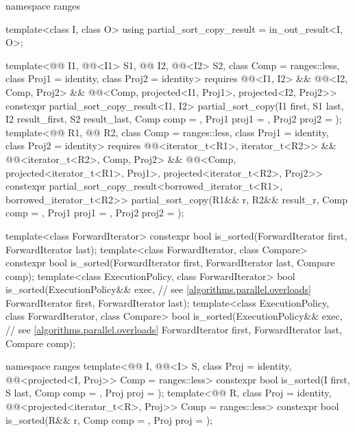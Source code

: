 \begin{codeblock}
{  namespace ranges {
    template<class I, class O>
      using partial_sort_copy_result = in_out_result<I, O>;

    template<@@ I1, @@<I1> S1,
             @@ I2, @@<I2> S2,
             class Comp = ranges::less, class Proj1 = identity, class Proj2 = identity>
      requires @@<I1, I2> && @@<I2, Comp, Proj2> &&
               @@<Comp, projected<I1, Proj1>, projected<I2, Proj2>>
      constexpr partial_sort_copy_result<I1, I2>
        partial_sort_copy(I1 first, S1 last, I2 result_first, S2 result_last,
                          Comp comp = {}, Proj1 proj1 = {}, Proj2 proj2 = {});
    template<@@ R1, @@ R2, class Comp = ranges::less,
             class Proj1 = identity, class Proj2 = identity>
      requires @@<iterator_t<R1>, iterator_t<R2>> &&
               @@<iterator_t<R2>, Comp, Proj2> &&
               @@<Comp, projected<iterator_t<R1>, Proj1>,
                                          projected<iterator_t<R2>, Proj2>>
      constexpr partial_sort_copy_result<borrowed_iterator_t<R1>, borrowed_iterator_t<R2>>
        partial_sort_copy(R1&& r, R2&& result_r, Comp comp = {},
                          Proj1 proj1 = {}, Proj2 proj2 = {});
  }

  template<class ForwardIterator>
    constexpr bool is_sorted(ForwardIterator first, ForwardIterator last);
  template<class ForwardIterator, class Compare>
    constexpr bool is_sorted(ForwardIterator first, ForwardIterator last,
                             Compare comp);
  template<class ExecutionPolicy, class ForwardIterator>
    bool is_sorted(ExecutionPolicy&& exec,                      // see \ref{algorithms.parallel.overloads}
                   ForwardIterator first, ForwardIterator last);
  template<class ExecutionPolicy, class ForwardIterator, class Compare>
    bool is_sorted(ExecutionPolicy&& exec,                      // see \ref{algorithms.parallel.overloads}
                   ForwardIterator first, ForwardIterator last,
                   Compare comp);

  namespace ranges {
    template<@@ I, @@<I> S, class Proj = identity,
             @@<projected<I, Proj>> Comp = ranges::less>
      constexpr bool is_sorted(I first, S last, Comp comp = {}, Proj proj = {});
    template<@@ R, class Proj = identity,
             @@<projected<iterator_t<R>, Proj>> Comp = ranges::less>
      constexpr bool is_sorted(R&& r, Comp comp = {}, Proj proj = {});
  }

}
\end{codeblock}
